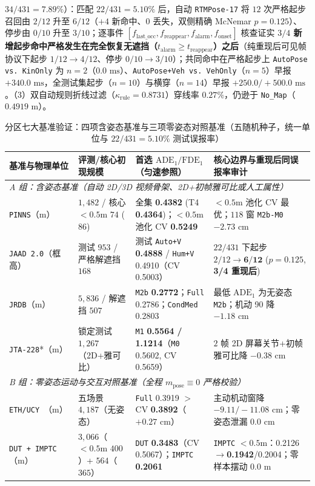 \documentclass[UTF8,a4paper,12pt,openany,oneside]{ctexrep}
\begin{document}
$34/431=7.89\%$）：匹配 $22/431=5.10\%$ 后，自动 \texttt{RTMPose-17} 将 $12$ 次严格起步召回由 $2/12$ 升至 $6/12$（$+4$ 新命中、$0$ 丢失，双侧精确 McNemar $p=0.125$）、停步由 $0/10$ 升至 $3/10$；逐事件 $[f_{\text{last\_occ}}, f_{\text{reappear}}, f_{\text{alarm}}, f_{\text{onset}}]$ 核查证实 \textbf{$3/4$ 新增起步命中严格发生在完全恢复无遮挡（$t_{\text{alarm}}\ge t_{\text{reappear}}$）之后}（纯重现后可见帧协议下起步 $1/12\to 4/12$、停步 $0/10\to 3/10$）；共同命中在严格起步上 \texttt{AutoPose vs.\ KinOnly} 为 $n=2$（$0.0\text{ ms}$）、\texttt{AutoPose+Veh vs.\ VehOnly}（$n=5$）早报 $+340.0\text{ ms}$，全测试集起步（$n=10$）与横穿（$n=14$）早报 $+250.0 / +500.0\text{ ms}$。（3）双自动规则折线过滤（$\kappa_{\text{rule}}=0.8731$）穿线率 $0.27\%$，仍逊于 \texttt{No\_Map}（$0.4919\text{ m}$）。

\begin{table}[!htbp]
\centering
\caption{分区七大基准验证：四项含姿态基准与三项零姿态对照基准（五随机种子，统一单位与 $22/431=5.10\%$ 测试误报率）}
\label{tab:thu_w21_22}
\footnotesize
\begin{tabular}{llll}
\toprule
基准与物理单位 & 评测/核心初现规模 & 首选 $\text{ADE}_1/\text{FDE}_1$（匀速参照） & 核心边界与重现后同误报率审计 \\
\midrule
\multicolumn{4}{l}{\textit{A 组：含姿态基准（自动 2D/3D 视频骨架、2D+初帧雅可比或人工属性）}} \\
\texttt{PINNS}（m） & $1{,}482$ / 核心 $<0.5$m $74$ ($86$) & 全集 \textbf{0.4382} (T4 \textbf{0.4364})；$<0.5$m 池化 CV \textbf{0.5249} & $<0.5$m 池化 CV 最优；$118$ 窗 \texttt{M2b-M0} \textbf{$-2.73\text{ cm}$} \\
\texttt{JAAD 2.0}（框高） & 测试 $953$ / 严格解遮挡 $168$ & 测试 \texttt{Auto+V} \textbf{0.4888} / \texttt{Hum+V} 0.4910（CV 0.5003） & $22/431$ 下起步 $2/12\to\textbf{6/12}$ ($p{=}0.125$, \textbf{3/4 重现后}) \\
\texttt{JRDB}（m） & $5{,}836$ / 解遮挡 $507$ & \texttt{M2b} \textbf{0.2772}；\texttt{Full} 0.2786；\texttt{CondMed} 0.2803 & 最低 $\text{ADE}_1$ 为无姿态 \texttt{M2b}；机动 90 降 \textbf{$-1.18\text{ cm}$} \\
\texttt{JTA-228}*（m） & 锁定测试 $1{,}267$（2D+雅可比） & \texttt{M1} \textbf{0.5564 / 1.1214}（\texttt{M0} 0.5602, CV 0.5659） & $2$ 帧 2D 屏幕关节+初帧雅可比降 \textbf{$-0.38\text{ cm}$} \\
\midrule
\multicolumn{4}{l}{\textit{B 组：零姿态运动与交互对照基准（全程 $m_{\text{pose}}\equiv 0$ 严格校验）}} \\
\texttt{ETH/UCY}~\cite{pellegrini2009eth}（m） & 五场景 $4{,}187$（无姿态） & \texttt{Full} 0.3919 $>$ CV \textbf{0.3892}（$+0.27\text{ cm}$） & 主动机动窗降 \textbf{$-9.11 / -11.08\text{ cm}$}；零姿态泄漏 $0.0\text{ cm}$ \\
\texttt{DUT + IMPTC}（m） & $3{,}066$（$<0.5$m $400$）+ $564$（$365$） & \texttt{DUT} \textbf{0.3483}（CV 0.5067）；\texttt{IMPTC} \textbf{0.2061} & \texttt{IMPTC} $<0.5$m：0.2126$\to$\textbf{0.1942}/0.2004；零样本摆动 $0.0\text{ m}$ \\
\bottomrule
\end{tabular}
\end{table}
\end{document}

